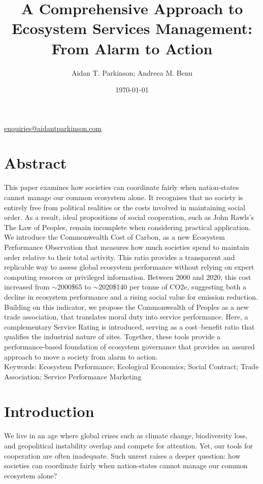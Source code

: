 \documentclass[12pt, oneside]{article}   	%
\title{A Comprehensive Approach to Ecosystem Services Management: From Alarm to Action}
\author{Aidan T. Parkinson; Andreea M. Benu}
\date{\today}							%
\begin{document}
\maketitle
\begin{center}
\href{mailto:enquiries@aidantparkinson.com}{enquiries@aidantparkinson.com}
\end{center}

\section{Abstract}
This paper examines how societies can coordinate fairly when nation-states cannot manage our common ecosystem alone.
It recognises that no society is entirely free from political realities or the costs involved in maintaining social order.
As a result, ideal propositions of social cooperation, such as John Rawls’s The Law of Peoples, remain incomplete when considering practical application.
We introduce the Commonwealth Cost of Carbon, as a new Ecosystem Performance Observation that measures how much societies spend to maintain order relative to their total activity.
This ratio provides a transparent and replicable way to assess global ecosystem performance without relying on expert computing resorces or privileged information.
Between 2000 and 2020, this cost increased from $\sim$2000\$65 to $\sim$2020\$140 per tonne of CO2e, suggesting both a decline in ecosystem performance and a rising social value for emission reduction.
Building on this indicator, we propose the Commonwealth of Peoples as a new trade association, that translates moral duty into service performance.
Here, a complementary Service Rating is introduced, serving as a cost–benefit ratio that qualifies the industrial nature of sites.
Together, these tools provide a performance-based foundation of ecosystem governance that provides an assured approach to move a society from alarm to action.\\

Keywords: Ecosystem Performance; Ecological Economics; Social Contract; Trade Association; Service Performance Marketing\\

\section{Introduction}

We live in an age where global crises such as climate change, biodiversity loss, and geopolitical instability overlap and compete for attention.
Yet, our tools for cooperation are often inadequate.
Such unrest raises a deeper question: how societies can coordinate fairly when nation-states cannot manage our common ecosystem alone?\\
\end{document}
